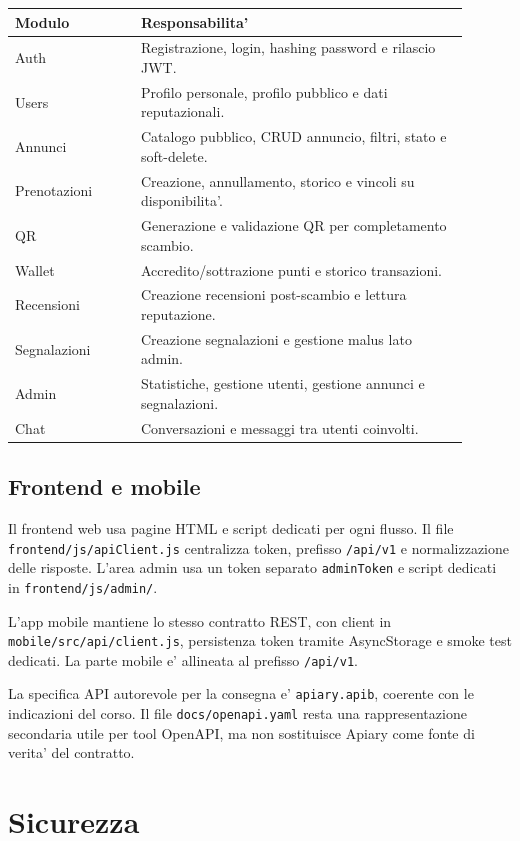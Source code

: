 \documentclass[11pt,a4paper]{article}
\begin{document}
\begin{longtable}{p{0.25\linewidth}p{0.65\linewidth}}
\textbf{Modulo} & \textbf{Responsabilita'} \\
\hline
Auth & Registrazione, login, hashing password e rilascio JWT. \\
Users & Profilo personale, profilo pubblico e dati reputazionali. \\
Annunci & Catalogo pubblico, CRUD annuncio, filtri, stato e soft-delete. \\
Prenotazioni & Creazione, annullamento, storico e vincoli su disponibilita'. \\
QR & Generazione e validazione QR per completamento scambio. \\
Wallet & Accredito/sottrazione punti e storico transazioni. \\
Recensioni & Creazione recensioni post-scambio e lettura reputazione. \\
Segnalazioni & Creazione segnalazioni e gestione malus lato admin. \\
Admin & Statistiche, gestione utenti, gestione annunci e segnalazioni. \\
Chat & Conversazioni e messaggi tra utenti coinvolti. \\
\end{longtable}

\subsection*{Frontend e mobile}

Il frontend web usa pagine HTML e script dedicati per ogni flusso. Il file \texttt{frontend/js/apiClient.js} centralizza token, prefisso \texttt{/api/v1} e normalizzazione delle risposte. L'area admin usa un token separato \texttt{adminToken} e script dedicati in \texttt{frontend/js/admin/}.

L'app mobile mantiene lo stesso contratto REST, con client in \texttt{mobile/src/api/client.js}, persistenza token tramite AsyncStorage e smoke test dedicati. La parte mobile e' allineata al prefisso \texttt{/api/v1}.

La specifica API autorevole per la consegna e' \texttt{apiary.apib}, coerente con le indicazioni del corso. Il file \texttt{docs/openapi.yaml} resta una rappresentazione secondaria utile per tool OpenAPI, ma non sostituisce Apiary come fonte di verita' del contratto.

\section{Sicurezza}
\end{document}
